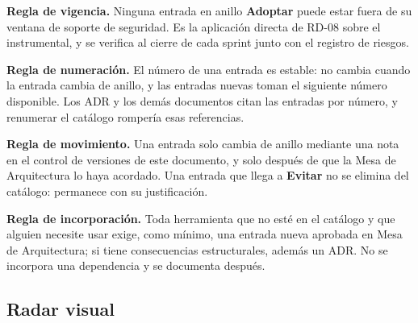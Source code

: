 \documentclass[11pt,a4paper]{article}
\newcommand{\adoptar}{\textcolor{ringAdoptar}{\textbf{Adoptar}}}
\newcommand{\evitar}{\textcolor{ringEvitar}{\textbf{Evitar}}}
\begin{document}
\vspace{0.2cm}
\noindent\textbf{Regla de vigencia.} Ninguna entrada en anillo \adoptar{} puede estar fuera de su ventana de soporte de seguridad. Es la aplicación directa de RD-08 sobre el instrumental, y se verifica al cierre de cada sprint junto con el registro de riesgos.

\vspace{0.2cm}
\noindent\textbf{Regla de numeración.} El número de una entrada es estable: no cambia cuando la entrada cambia de anillo, y las entradas nuevas toman el siguiente número disponible. Los ADR y los demás documentos citan las entradas por número, y renumerar el catálogo rompería esas referencias.

\vspace{0.2cm}
\noindent\textbf{Regla de movimiento.} Una entrada solo cambia de anillo mediante una nota en el control de versiones de este documento, y solo después de que la Mesa de Arquitectura lo haya acordado. Una entrada que llega a \evitar{} no se elimina del catálogo: permanece con su justificación.

\vspace{0.2cm}
\noindent\textbf{Regla de incorporación.} Toda herramienta que no esté en el catálogo y que alguien necesite usar exige, como mínimo, una entrada nueva aprobada en Mesa de Arquitectura; si tiene consecuencias estructurales, además un ADR. No se incorpora una dependencia y se documenta después.

\subsection{Radar visual}
\end{document}
